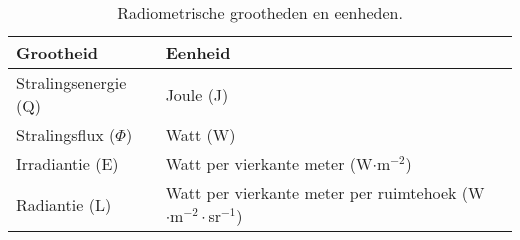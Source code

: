 \begin{table}
  \centering
  \begin{tabular}{@{}lll@{}}\toprule
    Grootheid                & Eenheid   \\ \midrule
    Stralingsenergie (Q)     & Joule (J) \\
    Stralingsflux ($\Phi$)   & Watt (W)  \\
    Irradiantie (E)          & Watt per vierkante meter (W$\cdot$m$^{-2}$) &              \\
    Radiantie (L)            & Watt per vierkante meter per ruimtehoek (W$\cdot$m$^{-2}\cdot$sr$^{-1}$) \\ \bottomrule
  \end{tabular}
  \caption{Radiometrische grootheden en eenheden.}
  \label{tbl:fw-eenheden}
\end{table}
